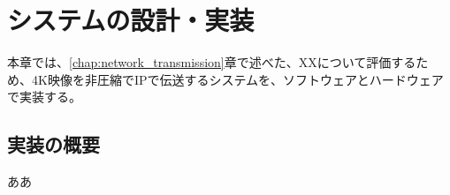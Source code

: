 \chapter{システムの設計・実装}
\label{chap:implementation}

本章では、\ref{chap:network_transmission}章で述べた、XXについて評価するため、4K映像を非圧縮でIPで伝送するシステムを、ソフトウェアとハードウェアで実装する。



\section{実装の概要}

ああ



